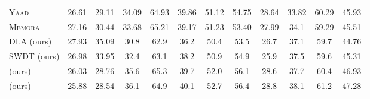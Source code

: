 \begin{table}[t!]
{\begin{tabular}{l|c c|c c c c c c c c c}
\textsc{Yaad} & 26.61 &   29.11 &  34.09  & 64.93  &  39.86  & 51.12  & 54.75  &  28.64 & 33.82 & 60.29 & 45.93 \\
\textsc{Memora} & 27.16 &  30.44 &  33.68  &  65.21  & 39.17  & 51.23  & 53.40  & 27.99 & 34.1& 59.29 & 45.51 \\
\midrule
DLA (ours) & 27.93 & 35.09 & 30.8 & 62.9 & 36.2  & 50.4 & 53.5 & 26.7 & 37.1 & 59.7 & 44.76 \\
SWDT (ours) & 26.98 & 33.95 & 32.4 & 63.1 & 38.2 & 50.9 & 54.9 & 25.9 & 37.5 & 59.6 & 45.31\\
\midrule
\omodel{} (ours) & 26.03 & 28.76  & 35.6 & 65.3 & 39.7 & 52.0 & 56.1 & 28.6 & 37.7 & 60.4 & 46.93\\
\model{} (ours) & 25.88  & 28.54  & 36.1 & 64.9 & 40.1 & 52.7 & 56.4 & 28.8 & 38.1 & 61.2 & 47.28\\
\bottomrule
\end{tabular}
}
\end{table}









































